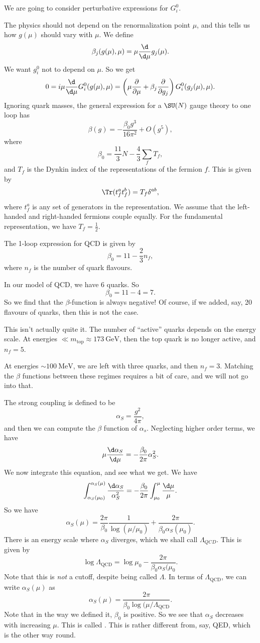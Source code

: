 \documentclass[a4paper]{article}
\begin{document}
We are going to consider perturbative expressions for $G_i^0$.

The physics should not depend on the renormalization point $\mu$, and this tells us how $g(\mu)$ should vary with $\mu$. We define
\[
  \beta_j(g(\mu), \mu) = \mu \frac{\d}{\d \mu} g_j(\mu).
\]
We want $g_i^0$ not to depend on $\mu$. So we get
\[
  0 = i \mu \frac{\d}{\d \mu} G_i^0(g(\mu), \mu) = \left(\mu \frac{\partial}{\partial \mu} + \beta_j \frac{\partial}{\partial g_j}\right) G_i^0(g_j(\mu), \mu).
\]
Ignoring quark masses, the general expression for a $\SU(N)$ gauge theory to one loop has
\[
  \beta(g) = - \frac{\beta_0 g^3}{16 \pi^2} + O(g^5),
\]
where
\[
  \beta_0 = \frac{11}{3}N - \frac{4}{3} \sum_f T_f,
\]
and $T_f$ is the Dynkin index of the representations of the fermion $f$. This is given by
\[
  \Tr (t_f^a t_f^b) = T_f \delta^{ab},
\]
where $t_f^a$ is any set of generators in the representation. We assume that the left-handed and right-handed fermions couple equally. For the fundamental representation, we have $T_f = \frac{1}{2}$.

The 1-loop expression for QCD is given by
\[
  \beta_0 = 11 - \frac{2}{3} n_f,
\]
where $n_f$ is the number of quark flavours.

In our model of QCD, we have $6$ quarks. So
\[
  \beta_0 = 11 - 4 = 7.
\]
So we find that the $\beta$-function is always negative! Of course, if we added, say, 20 flavours of quarks, then this is not the case.

This isn't actually quite it. The number of ``active'' quarks depends on the energy scale. At energies $\ll m_{\mathrm{top}} \approx \SI{173}{\giga\electronvolt}$, then the top quark is no longer active, and $n_f = 5$.

At energies $\sim \SI{100}{\mega\electronvolt}$, we are left with three quarks, and then $n_f = 3$. Matching the $\beta$ functions between these regimes requires a bit of care, and we will not go into that.

The strong coupling is defined to be
\[
  \alpha_S = \frac{g^2}{4\pi},
\]
and then we can compute the $\beta$ function of $\alpha_s$. Neglecting higher order terms, we have
\[
  \mu \frac{\d \alpha_S}{\d \mu} = - \frac{\beta_0}{2\pi} \alpha_S^2.
\]
We now integrate this equation, and see what we get. We have
\[
  \int_{\alpha_S(\mu_0)}^{\alpha_S(\mu)} \frac{\d \alpha_S}{\alpha_S^2} = - \frac{\beta_0}{2\pi} \int_{\mu_0}^\mu \frac{\d \mu}{\mu}.
\]
So we have
\[
  \alpha_S(\mu) = \frac{2\pi}{\beta_0} \frac{1}{\log (\mu/\mu_0)} + \frac{2\pi}{\beta_0 \alpha_S(\mu_0)}.
\]
There is an energy scale where $\alpha_S$ diverges, which we shall call $\Lambda_{QCD}$. This is given by
\[
  \log \Lambda_{\mathrm{QCD}} = \log \mu_0 - \frac{2\pi}{\beta_0 \alpha_S(\mu_0}.
\]
Note that this is \emph{not} a cutoff, despite being called $\Lambda$. In terms of $\Lambda_{\mathrm{QCD}}$, we can write $\alpha_S(\mu)$ as
\[
  \alpha_S(\mu) = \frac{2\pi}{\beta_0 \log (\mu/\Lambda_{\mathrm{QCD}}}.
\]
Note that in the way we defined it, $\beta_0$ is positive. So we see that $\alpha_S$ decreases with increasing $\mu$. This is called . This is rather different from, say, QED, which is the other way round.
\end{document}
